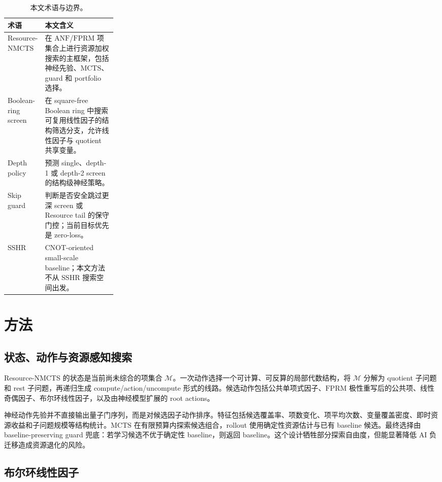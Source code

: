 \documentclass[UTF8,fontset=macnew,11pt]{ctexart}
\newcommand{\method}{Resource-NMCTS}
\newcommand{\screen}{Boolean-ring screen}
\newcommand{\anf}{\ensuremath{\mathrm{ANF}}}
\newcommand{\fprm}{\ensuremath{\mathrm{FPRM}}}
\newcommand{\mcts}{\ensuremath{\mathrm{MCTS}}}
\begin{document}
\begin{table}[t]
\centering
\small
\caption{本文术语与边界。}
\label{tab:terms}
\begin{tabularx}{\linewidth}{>{\raggedright\arraybackslash}p{0.25\linewidth}>{\raggedright\arraybackslash}X}
\toprule
术语 & 本文含义 \\
\midrule
\method{} & 在 \anf{}/\fprm{} 项集合上进行资源加权搜索的主框架，包括神经先验、\mcts{}、guard 和 portfolio 选择。 \\
\screen{} & 在 square-free Boolean ring 中搜索可复用线性因子的结构筛选分支，允许线性因子与 quotient 共享变量。 \\
Depth policy & 预测 single、depth-1 或 depth-2 screen 的结构级神经策略。 \\
Skip guard & 判断是否安全跳过更深 screen 或 Resource tail 的保守门控；当前目标优先是 zero-loss。 \\
SSHR & CNOT-oriented small-scale baseline；本文方法不从 SSHR 搜索空间出发。 \\
\bottomrule
\end{tabularx}
\end{table}

\section{方法}

\subsection{状态、动作与资源感知搜索}

\method{} 的状态是当前尚未综合的项集合 $\mathcal{M}$。一次动作选择一个可计算、可反算的局部代数结构，将 $\mathcal{M}$ 分解为 quotient 子问题和 rest 子问题，再递归生成 compute/action/uncompute 形式的线路。候选动作包括公共单项式因子、\fprm{} 极性重写后的公共项、线性奇偶因子、布尔环线性因子，以及由神经模型扩展的 root actions。

神经动作先验并不直接输出量子门序列，而是对候选因子动作排序。特征包括候选覆盖率、项数变化、项平均次数、变量覆盖密度、即时资源收益和子问题规模等结构统计。\mcts{} 在有限预算内探索候选组合，rollout 使用确定性资源估计与已有 baseline 候选。最终选择由 baseline-preserving guard 兜底：若学习候选不优于确定性 baseline，则返回 baseline。这个设计牺牲部分探索自由度，但能显著降低 AI 负迁移造成资源退化的风险。

\subsection{布尔环线性因子}
\end{document}
